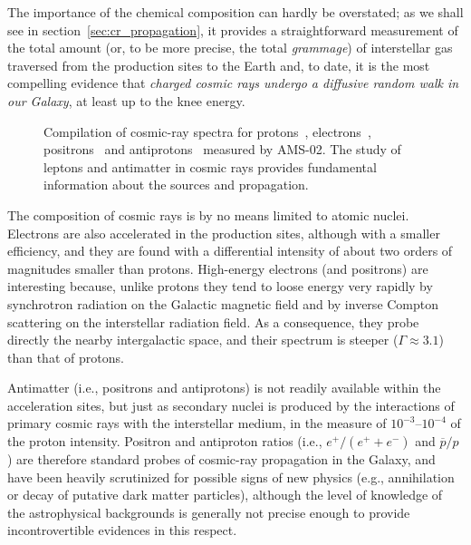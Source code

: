The importance of the chemical composition can hardly be overstated; as we shall see
in section~\ref{sec:cr_propagation}, it provides a straightforward measurement of the
total amount (or, to be more precise, the total \emph{grammage}) of interstellar gas
traversed from the production sites to the Earth and, to date, it is the most compelling
evidence that \emph{charged cosmic rays undergo a diffusive random walk in our Galaxy},
at least up to the knee energy.

\begin{figure}[!htbp]
  
  \caption{Compilation of cosmic-ray spectra for protons~\cite{2015PhRvL.114q1103A},
    electrons~\cite{2019PhRvL.122j1101A}, positrons~\cite{2019PhRvL.122d1102A} and
    antiprotons~\cite{2016PhRvL.117i1103A} measured by AMS-02. The study of leptons
    and antimatter in cosmic rays provides fundamental information about the
    sources and propagation.}
  \label{fig:cr_others}
\end{figure}

The composition of cosmic rays is by no means limited to atomic nuclei. Electrons
are also accelerated in the production sites, although with a smaller efficiency,
and they are found with a differential intensity of about two orders of magnitudes
smaller than protons. High-energy electrons (and positrons) are interesting because,
unlike protons they tend to loose energy very rapidly by synchrotron radiation on
the Galactic magnetic field and by inverse Compton scattering on the interstellar
radiation field. As a consequence, they probe directly
the nearby intergalactic space, and their spectrum is steeper ($\Gamma \approx 3.1$)
than that of protons.

Antimatter (i.e., positrons and antiprotons) is not readily available within the
acceleration sites, but just as secondary nuclei is produced by the interactions
of primary cosmic rays with the interstellar medium, in the measure of $10^{-3}$--$10^{-4}$
of the proton intensity. Positron and antiproton ratios (i.e., $e^+ / (e^+ + e^-)$
and $\overline{p} / p$) are therefore standard probes of cosmic-ray propagation in
the Galaxy, and have been heavily scrutinized for possible signs of new physics
(e.g., annihilation or decay of putative dark matter particles), although the level
of knowledge of the astrophysical backgrounds is generally not precise enough to
provide incontrovertible evidences in this respect.

